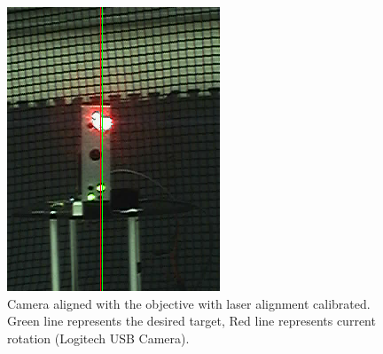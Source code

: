 \documentclass[botnum, fleqn]{unmeethesis}
\begin{document}
\begin{figure}[ht]
 \begin{center}
  \includegraphics[width=0.5 \textwidth]{figures/postcalibration.png}
  \caption{\small \label{fig:postcalibration} Camera aligned with the objective with laser alignment calibrated. Green line represents the desired target, Red line represents current rotation (Logitech USB Camera).}
 \end{center}
\end{figure}
\end{document}
